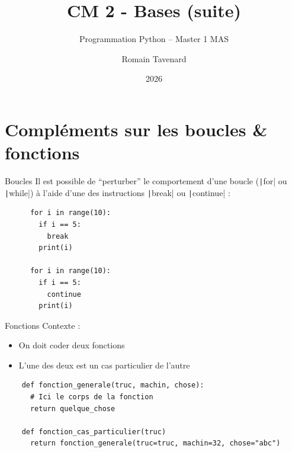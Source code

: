 \documentclass[10pt]{beamer}
\title[M1 MAS -- Python -- Bases (suite)]{CM 2 - Bases (suite)}
\subtitle{Programmation Python -- Master 1 MAS}
\author{Romain Tavenard}
\date{2026}
\institute{%
\hypersetup{urlcolor=.}
\makebox[2.2ex][c]{\faEnvelope}\enspace\href{mailto:romain.tavenard@univ-rennes2.fr}{\texttt{romain.tavenard@univ-rennes2.fr}}\\%
}
\begin{document}
\maketitle

\section{Compléments sur les boucles \& fonctions}

\begin{frame}[fragile]{Boucles}  
  Il est possible de ``perturber'' le comportement d'une boucle (\texttt|for| ou \texttt|while|) à l'aide d'une des instructions \texttt|break| ou \texttt|continue| :

  \begin{beamercodeblock}
    \begin{verbatim}
      for i in range(10):
        if i == 5:
          break
        print(i)
      
      for i in range(10):
        if i == 5:
          continue
        print(i)
    \end{verbatim}
  \end{beamercodeblock}
\end{frame}

\begin{frame}[fragile]{Fonctions}  
  Contexte :

  \begin{itemize}
    \item On doit coder deux fonctions
    \item L'une des deux est un cas particulier de l'autre
  \end{itemize}

  \begin{beamercodeblock}
    \begin{verbatim}
    def fonction_generale(truc, machin, chose):
      # Ici le corps de la fonction
      return quelque_chose
    
    def fonction_cas_particulier(truc)
      return fonction_generale(truc=truc, machin=32, chose="abc")
    \end{verbatim}
  \end{beamercodeblock}
\end{frame}
\end{document}
